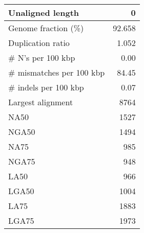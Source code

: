 \documentclass[12pt,a4paper]{article}
\begin{document}
\begin{table}[ht]
\begin{center}
\begin{tabular}{|l*{1}{|r}|}
Unaligned length & 0 \\ \hline
Genome fraction (\%) & 92.658 \\ \hline
Duplication ratio & 1.052 \\ \hline
\# N's per 100 kbp & 0.00 \\ \hline
\# mismatches per 100 kbp & 84.45 \\ \hline
\# indels per 100 kbp & 0.07 \\ \hline
Largest alignment & 8764 \\ \hline
NA50 & 1527 \\ \hline
NGA50 & 1494 \\ \hline
NA75 & 985 \\ \hline
NGA75 & 948 \\ \hline
LA50 & 966 \\ \hline
LGA50 & 1004 \\ \hline
LA75 & 1883 \\ \hline
LGA75 & 1973 \\ \hline
\end{tabular}
\end{center}
\end{table}
\end{document}
